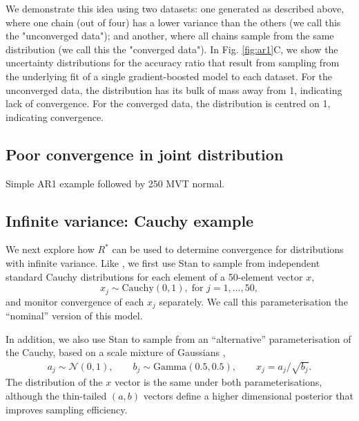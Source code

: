 \documentclass{article}
\newcommand{\N}{\mathcal{N}}
\begin{document}
We demonstrate this idea using two datasets: one generated as described above, where one chain (out of four) has a lower variance than the others (we call this the "unconverged data"); and another, where all chains sample from the same distribution (we call this the "converged data"). In Fig. \ref{fig:ar1}C, we show the uncertainty distributions for the accuracy ratio that result from sampling from the underlying fit of a single gradient-boosted model to each dataset. For the unconverged data, the distribution has its bulk of mass away from 1, indicating lack of convergence. For the converged data, the distribution is centred on 1, indicating convergence. 

\subsection{Poor convergence in joint distribution}
Simple AR1 example followed by 250 MVT normal.

\subsection{Infinite variance: Cauchy example}
We next explore how $R^*$ can be used to determine convergence for distributions with infinite variance. Like \cite{vehtari2019rank}, we first use Stan to sample from independent standard Cauchy distributions for each element of a 50-element vector $x$,
%
\begin{equation}
x_j\sim \text{Cauchy}(0, 1),\; \text{for } j=1,...,50,
\end{equation}
%
and monitor convergence of each $x_j$ separately. We call this parameterisation the ``nominal'' version of this model.

In addition, we also use Stan to sample from an ``alternative'' parameterisation of the Cauchy, based on a scale mixture of Gaussians \cite{vehtari2019rank},
%
\begin{align}
a_j \sim  \N(0,1), \qquad
b_j \sim  \text{Gamma}(0.5, 0.5), \qquad
x_j =  a_j/\sqrt{b_j}.
\end{align}
%
The distribution of the $x$ vector is the same under both parameterisations, although the thin-tailed $(a,b)$ vectors define a higher dimensional posterior that improves sampling efficiency.
\end{document}
